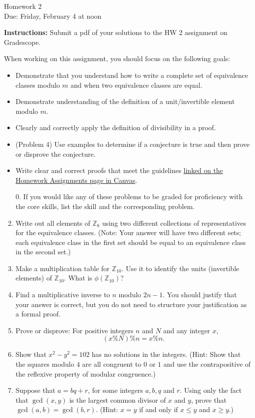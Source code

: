 \documentclass[12pt]{article}
\newcommand{\Z}{\mathbb{Z}}
\begin{document}
\begin{center}
{\Large Homework 2}\\
Due: Friday,  February 4 at noon\\


\end{center}
{\bf Instructions:} Submit a pdf of your solutions to the HW 2 assignment on Gradescope. 

When working on this assignment, you should focus on the following goals:
\begin{itemize}
\item Demonstrate that you understand how to write a complete set of equivalence classes modulo $m$ and when two equivalence classes are equal. 
\item Demonstrate understanding of the definition of a unit/invertible element modulo $m$.  
\item Clearly and correctly apply the definition of divisibility in a proof. 
\item (Problem 4) Use examples to determine if a conjecture is true and then prove or disprove the conjecture. 
\item Write clear and correct proofs that meet the guidelines \href{https://canvas.umn.edu/courses/292043/pages/writing-guidelines}{linked on the Homework Assignments page in Canvas}.
\end{itemize}

\begin{enumerate}
\item[0.] If you would like any of these problems to be graded for proficiency with the core skills, list the skill and the corresponding problem. 
\item Write out all elements of $\Z_{8}$ using two different collections of representatives for the equivalence classes.  (Note: Your answer will have two different sets; each equivalence class in the first set should be equal to an equivalence class in the second set.)
\item Make a multiplication table for $\Z_{10}$. Use it to identify the units (invertible elements) of $\Z_{10}$.  What is $\phi(\Z_{10})$?
\item Find a multiplicative inverse to $n$ modulo $2n-1$. You should justify that your answer is correct, but you do not need to structure your justification as a formal proof. 

\item Prove or disprove: For positive integers $n$ and $N$ and any integer $x$, $$(x\% N)\% n= x\% n.$$
\item Show that $x^2-y^2=102$ has no solutions in the integers. (Hint: Show that the squares modulo $4$ are all congruent to $0$ or $1$ and use the contrapositive of the reflexive property of modular congruence.)

\item Suppose that $a=bq+r$, for some integers $a,b, q$ and $r$. Using only the fact that $\gcd(x,y)$ is the largest common divisor of $x$ and $y$, prove that $\gcd(a,b)=\gcd(b,r)$.  (Hint: $x=y$ if and only if $x\le y$ and $x\ge y$.)

\end{enumerate}
\end{document}
